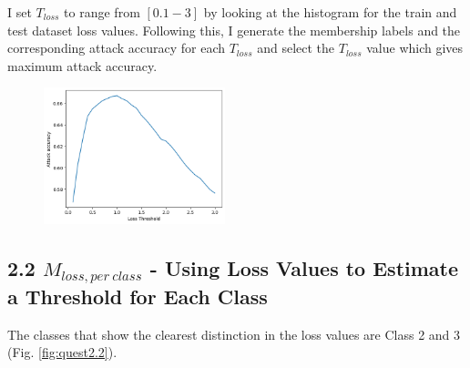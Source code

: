 I set $T_{loss}$ to range from $[0.1 - 3]$ by looking at the histogram for the train and test dataset loss values. Following this, I generate the membership labels and the corresponding attack accuracy for each $T_{loss}$ and select the $T_{loss}$ value which gives maximum attack accuracy.

\begin{figure}[h]
    \centering
    \includegraphics[width=0.47\textwidth]{quest2-1.png}
\end{figure}

\subsection*{2.2 $M_{loss, per\ class}$ - Using Loss Values to Estimate a Threshold for Each Class}
The classes that show the clearest distinction in the loss values are Class 2 and 3 (Fig. \ref{fig:quest2.2}).

